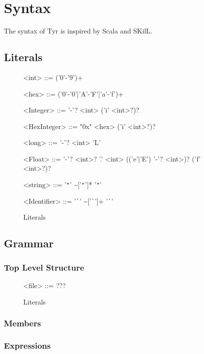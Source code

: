 \section{Syntax}

The syntax of Tyr is inspired by Scala and SKilL.


\subsection{Literals}


\begin{figure}
	\begin{grammar}
		<int> ::= ('0'-'9')+
		
		<hex> ::= ('0'-'0'|'A'-'F'|'a'-'f')+
		
		<Integer> ::= '-'? <int> ('i' <int>?)?
		
		<HexInteger> ::= "0x" <hex> ('i' <int>?)?
		
		<long> ::= '-'? <int> 'L'
		
		<Float> ::= '-'? <int>? '.' <int> (('e'|'E') '-'? <int>)? ('f' <int>?)?
		
		<string> ::= '\verb|"|' \textasciitilde['\verb|"|']* '\verb|"|'
		
		<Identifier> ::= '\verb|`|' \textasciitilde['\verb|`|']+ '\verb|`|'
	\end{grammar}
	\caption{Literals}
	\label{fig:syn:literals}
\end{figure}

\subsection{Grammar}

\subsubsection{Top Level Structure}

\begin{figure}
	\begin{grammar}
		<file> ::= ???
	\end{grammar}
	\caption{Literals}
	\label{fig:syn:top:level}
\end{figure}

\subsubsection{Members}

\subsubsection{Expressions}